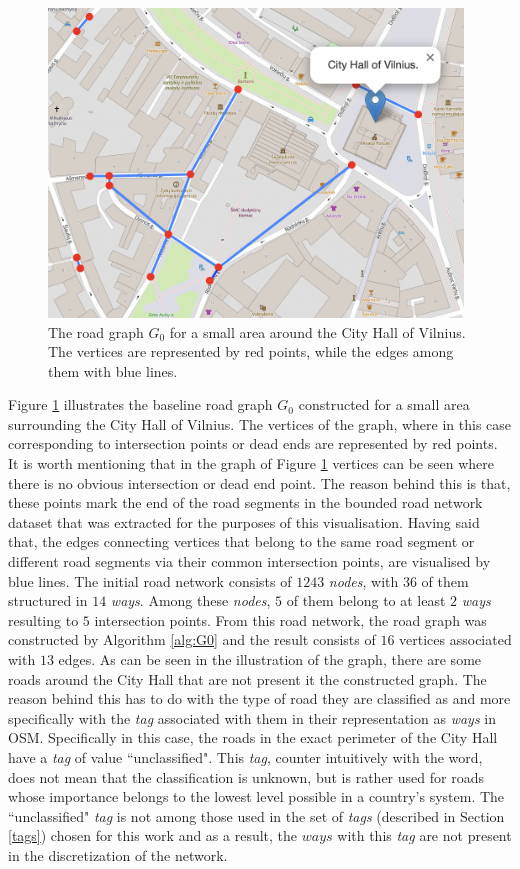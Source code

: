 \documentclass[12pt]{article}
\theoremstyle{definition}
\begin{document}
\begin{figure}
    \centering
    \includegraphics[width=11cm]{images/G0.png}
    \caption{The road graph $G_0$ for a small area around the City Hall of Vilnius. The vertices are represented by red points, while the edges among them with blue lines.}
    \label{fig:G0}
\end{figure}

Figure \ref{fig:G0} illustrates the baseline road graph $G_0$ constructed for a small area surrounding the City Hall of Vilnius. The vertices of the graph, where in this case corresponding to intersection points or dead ends are represented by red points. It is worth mentioning that in the graph of Figure \ref{fig:G0} vertices can be seen where there is no obvious intersection or dead end point. The reason behind this is that, these points mark the end of the road segments in the bounded road network dataset that was extracted for the purposes of this visualisation. Having said that, the edges connecting vertices that belong to the same road segment or different road segments via their common intersection points, are visualised by blue lines. The initial road network consists of $1243$ \textit{nodes}, with $36$ of them structured in $14$ \textit{ways}. Among these \textit{nodes}, $5$ of them belong to at least $2$ \textit{ways} resulting to $5$ intersection points. From this road network, the road graph was constructed by Algorithm \ref{alg:G0} and the result consists of $16$ vertices associated  with $13$ edges. As can be seen in the illustration of the graph, there are some roads around the City Hall that are not present it the constructed graph. The reason behind this has to do with the type of road they are classified as and more specifically with the \textit{tag} associated with them in their representation as \textit{ways} in OSM. Specifically in this case, the roads in the exact perimeter of the City Hall have a \textit{tag} of value ``unclassified". This \textit{tag}, counter intuitively with the word, does not mean that the classification is unknown, but is rather used for roads whose importance belongs to the lowest level possible in a country's system. The ``unclassified" \textit{tag} is not among those used in the set of \textit{tags} (described in Section \ref{tags}) chosen for this work and as a result, the $ways$ with this \textit{tag} are not present in the discretization of the network.  
\end{document}
